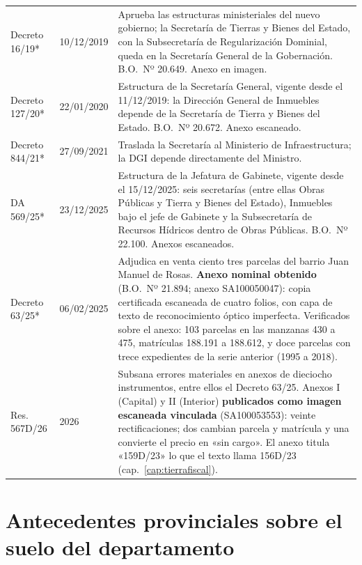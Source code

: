 \begin{longtable}{@{}p{3.2cm}p{1.9cm}p{7.9cm}@{}}
Decreto 16/19* & 10/12/2019 & Aprueba las estructuras ministeriales del nuevo gobierno; la Secretaría de Tierras y Bienes del Estado, con la Subsecretaría de Regularización Dominial, queda en la Secretaría General de la Gobernación. B.O.\ Nº 20.649. Anexo en imagen. \\
Decreto 127/20* & 22/01/2020 & Estructura de la Secretaría General, vigente desde el 11/12/2019: la Dirección General de Inmuebles depende de la Secretaría de Tierra y Bienes del Estado. B.O.\ Nº 20.672. Anexo escaneado. \\
Decreto 844/21* & 27/09/2021 & Traslada la Secretaría al Ministerio de Infraestructura; la DGI depende directamente del Ministro. \\
DA 569/25* & 23/12/2025 & Estructura de la Jefatura de Gabinete, vigente desde el 15/12/2025: seis secretarías (entre ellas Obras Públicas y Tierra y Bienes del Estado), Inmuebles bajo el jefe de Gabinete y la Subsecretaría de Recursos Hídricos dentro de Obras Públicas. B.O.\ Nº 22.100. Anexos escaneados. \\
Decreto 63/25* & 06/02/2025 & Adjudica en venta ciento tres parcelas del barrio Juan Manuel de Rosas. \textbf{Anexo nominal obtenido} (B.O.\ Nº 21.894; anexo SA100050047): copia certificada escaneada de cuatro folios, con capa de texto de reconocimiento óptico imperfecta. Verificados sobre el anexo: 103 parcelas en las manzanas 430 a 475, matrículas 188.191 a 188.612, y doce parcelas con trece expedientes de la serie anterior (1995 a 2018). \\
Res. 567D/26 & 2026 & Subsana errores materiales en anexos de dieciocho instrumentos, entre ellos el Decreto 63/25. Anexos I (Capital) y II (Interior) \textbf{publicados como imagen escaneada vinculada} (SA100053553): veinte rectificaciones; dos cambian parcela y matrícula y una convierte el precio en «sin cargo». El anexo titula «159D/23» lo que el texto llama 156D/23 (cap.\ \ref{cap:tierrafiscal}). \\
\bottomrule
\end{longtable}

\section*{Antecedentes provinciales sobre el suelo del departamento}

